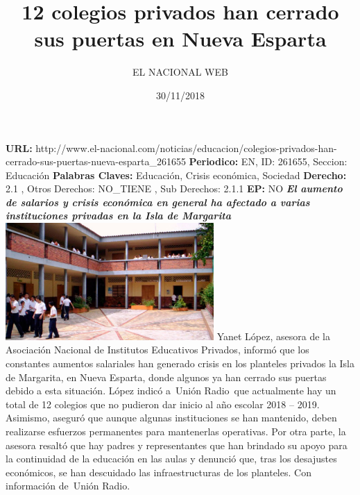 \documentclass{article}%
\title{\textbf{12 colegios privados han cerrado sus puertas en Nueva Esparta}}%
\author{EL NACIONAL WEB}%
\date{30/11/2018}%
\begin{document}
%
\normalsize%
\maketitle%
\textbf{URL: }%
http://www.el{-}nacional.com/noticias/educacion/colegios{-}privados{-}han{-}cerrado{-}sus{-}puertas{-}nueva{-}esparta\_261655\newline%
%
\textbf{Periodico: }%
EN, %
ID: %
261655, %
Seccion: %
Educación\newline%
%
\textbf{Palabras Claves: }%
Educación, Crisis económica, Sociedad\newline%
%
\textbf{Derecho: }%
2.1%
, Otros Derechos: %
NO\_TIENE%
, Sub Derechos: %
2.1.1%
\newline%
%
\textbf{EP: }%
NO\newline%
\newline%
%
\textbf{\textit{El aumento de salarios y crisis económica en general ha afectado a varias instituciones privadas en la Isla de Margarita}}%
\newline%
\newline%
%
\includegraphics[width=300px]{142.jpg}%
\newline%
%
Yanet López, asesora de la Asociación Nacional de Institutos Educativos Privados, informó que los constantes aumentos salariales han generado crisis en los planteles privados la Isla de Margarita, en Nueva Esparta, donde algunos ya han cerrado sus puertas debido a esta situación.%
\newline%
%
López indicó a~Unión Radio~que actualmente hay un total de 12 colegios que no pudieron dar inicio al año escolar 2018 – 2019. Asimismo, aseguró que aunque algunas instituciones se han mantenido, deben realizarse esfuerzos permanentes para mantenerlas operativas.%
\newline%
%
Por otra parte, la asesora resaltó que hay padres y representantes que han brindado su apoyo para la continuidad de la educación en las aulas y denunció que, tras los desajustes económicos, se han descuidado las infraestructuras de los planteles.%
\newline%
%
Con información de~Unión Radio.%
\newline%
%
\end{document}
